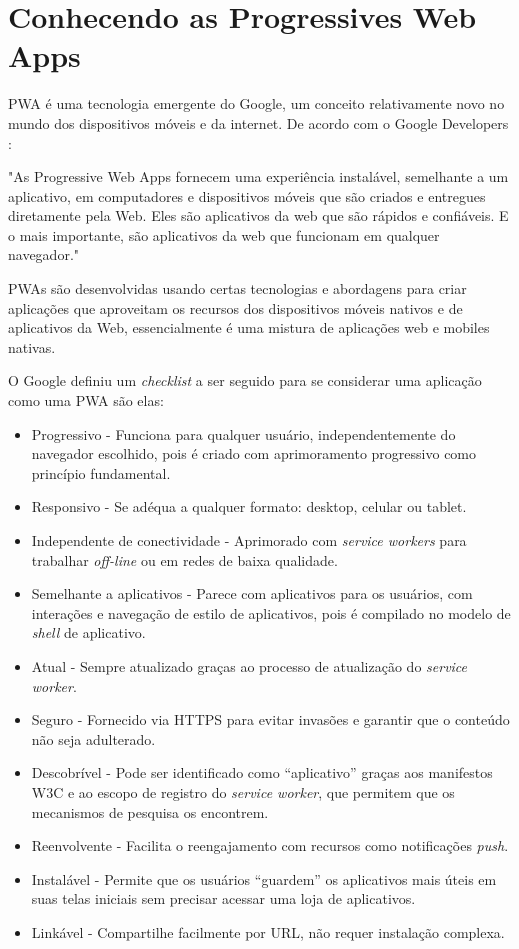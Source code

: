 \chapter{Conhecendo as Progressives Web Apps}

\ac{PWA} é uma tecnologia emergente do Google, um conceito relativamente novo no mundo dos dispositivos móveis e da internet. De acordo com o Google Developers \cite{pwa}: \begin{citacao}
"As Progressive Web Apps fornecem uma experiência instalável, semelhante a um aplicativo, em computadores e dispositivos móveis que são criados e entregues diretamente pela Web. Eles são aplicativos da web que são rápidos e confiáveis. E o mais importante, são aplicativos da web que funcionam em qualquer navegador."
\end{citacao}

 \ac{PWA}s são desenvolvidas usando certas tecnologias e abordagens para criar aplicações que aproveitam os recursos dos dispositivos móveis nativos e de aplicativos da Web, essencialmente é uma mistura de aplicações web e mobiles nativas.

O Google definiu um \textit{checklist} a ser seguido para se considerar uma aplicação como uma \ac{PWA} são elas:

\begin{itemize}
	\item Progressivo - Funciona para qualquer usuário, independentemente do navegador escolhido, pois é criado com aprimoramento progressivo como princípio fundamental.
	\item Responsivo - Se adéqua a qualquer formato: desktop, celular ou tablet.
	\item Independente de conectividade - Aprimorado com \textit{service workers} para trabalhar \textit{off-line} ou em redes de baixa qualidade.
	\item Semelhante a aplicativos - Parece com aplicativos para os usuários, com interações e navegação de estilo de aplicativos, pois é compilado no modelo de \textit{shell} de aplicativo.
	\item Atual - Sempre atualizado graças ao processo de atualização do \textit{service worker}.
	\item Seguro - Fornecido via HTTPS para evitar invasões e garantir que o conteúdo não seja adulterado.
	\item Descobrível - Pode ser identificado como “aplicativo” graças aos manifestos W3C e ao escopo de registro do \textit{service worker}, que permitem que os mecanismos de pesquisa os encontrem.
	\item Reenvolvente - Facilita o reengajamento com recursos como notificações \textit{push}.
	\item Instalável - Permite que os usuários “guardem” os aplicativos mais úteis em suas telas iniciais sem precisar acessar uma loja de aplicativos.
	\item Linkável - Compartilhe facilmente por URL, não requer instalação complexa.
\end{itemize}

